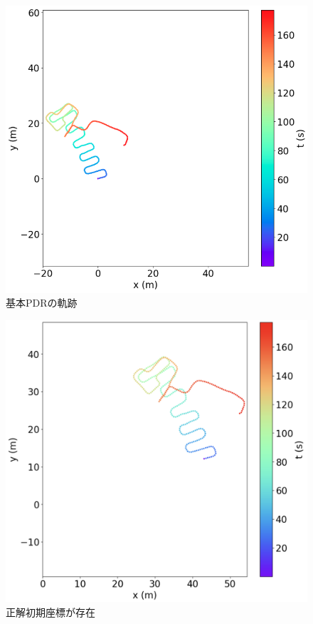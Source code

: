 \begin{figure}[H]
    \centering
    \includegraphics[width=\linewidth]{../image/pdr.jpg}
    \caption{基本PDRの軌跡}    \label{fig:pdr}
\end{figure}


\begin{figure}[H]
    \centering
    \includegraphics[width=\linewidth]{../image/pdr-move.jpg}
    \caption{正解初期座標が存在}    \label{fig:pdr-move}
\end{figure}


